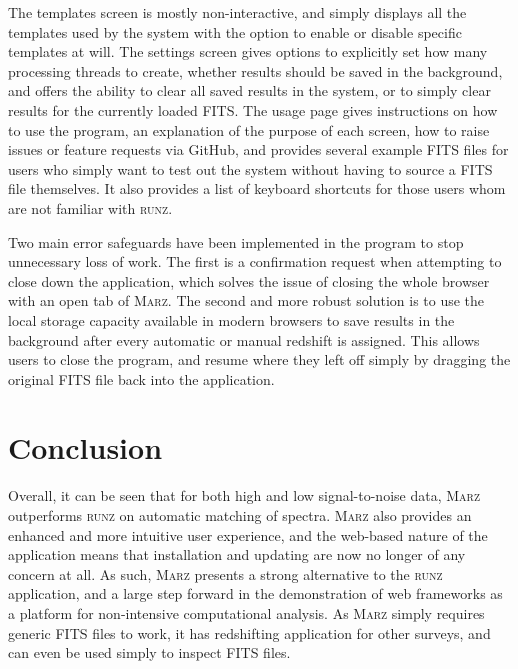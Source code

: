 \documentclass[iop]{emulateapj}
\newcommand{\runz}{\textsc{runz}}
\newcommand{\marz}{\textsc{Marz}}
\begin{document}
The templates screen is mostly non-interactive, and simply displays all the templates used by the system with the option to enable or disable specific templates at will. The settings screen gives options to explicitly set how many processing threads to create, whether results should be saved in the background, and offers the ability to clear all saved results in the system, or to simply clear results for the currently loaded FITS. The usage page gives instructions on how to use the program, an explanation of the purpose of each screen, how to raise issues or feature requests via GitHub, and provides several example FITS files for users who simply want to test out the system without having to source a FITS file themselves. It also provides a list of keyboard shortcuts for those users whom are not familiar with \runz{}.

Two main error safeguards have been implemented in the program to stop unnecessary loss of work. The first is a confirmation request when attempting to close down the application, which solves the issue of closing the whole browser with an open tab of \marz{}. The second and more robust solution is to use the local storage capacity available in modern browsers to save results in the background after every automatic or manual redshift is assigned. This allows users to close the program, and resume where they left off simply by dragging the original FITS file back into the application.













\section{Conclusion}

Overall, it can be seen that for both high and low signal-to-noise data, \marz{} outperforms \runz{} on automatic matching of spectra. \marz{} also provides an enhanced and more intuitive user experience, and the web-based nature of the application means that installation and updating are now no longer of any concern at all. As such, \marz{} presents a strong alternative to the \runz{} application, and a large step forward in the demonstration of web frameworks as a platform for non-intensive computational analysis. As \marz{} simply requires generic FITS files to work, it has redshifting application for other surveys, and can even be used simply to inspect FITS files.
\end{document}

